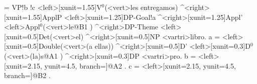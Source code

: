 \begin{exe}
	\ex\label{ex:authier:35}
	\jtree[xunit=2,labelgap=0.2]
	\! = {VP}!b !c
	<left>[xunit=1.55]{V$^{0}$}(<vert>{les entregamos}) ^<right>[xunit=1.55]{ApplP}
	<left>[xunit=1.25]{DP-Goal}!a ^<right>[xunit=1.25]{Appl'}
	<left>{Appl$^{0}$}(<vert>{le}@B1 ) ^<right>{DP-Theme}
	<left>[xunit=0.5]{Det}(<vert>{el}) ^<right>[xunit=0.5]{NP} <vartri>{libro}.
	\!a = <left>[xunit=0.5]{Double}(<vert>{(a ellas)}) ^<right>[xunit=0.5]{D'}
	<left>[xunit=0.3]{D$^{0}$}(<vert>{(la)s}@A1 ) ^<right>[xunit=0.3]{DP} <vartri>{pro}.
	\!b = <left>[xunit=2.15, yunit=4.5, branch=\blank]{}@A2 .
	\!c = <left>[xunit=2.15, yunit=4.5, branch=\blank]{}@B2 .
	\endjtree
\end{exe}
